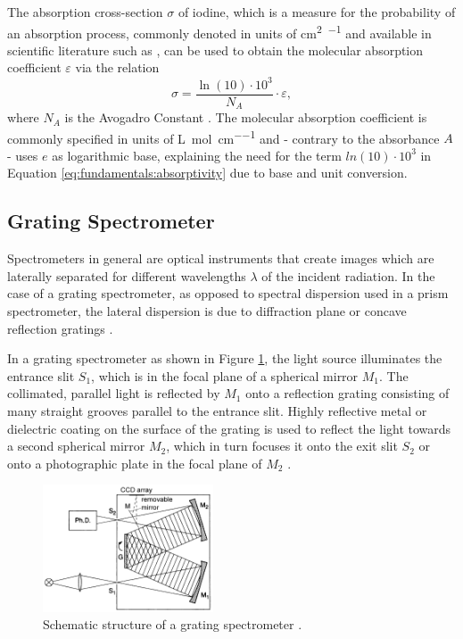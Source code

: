 The absorption cross-section $\sigma$ of iodine, which is a measure for the probability of an absorption process, commonly denoted in units of \si{\cm\squared\per\molecule} and available in scientific literature such as \cite{Iodine}, can be used to obtain the molecular absorption coefficient $\varepsilon$ via the relation
\begin{equation}
    \label{eq:fundamentals:absorptivity}
    \sigma = \frac{\ln(10) \cdot 10^3}{N_A} \cdot \varepsilon ,
\end{equation}
where $N_A$ is the Avogadro Constant \cite{attenuation}. The molecular absorption coefficient is commonly specified in units of \si{\liter\per\mol\per\cm} and - contrary to the absorbance $A$ - uses $e$ as logarithmic base, explaining the need for the term $ln(10) \cdot 10^3$ in Equation \ref{eq:fundamentals:absorptivity} due to base and unit conversion.


\subsection{Grating Spectrometer}

Spectrometers in general are optical instruments that create images which are laterally separated for different wavelengths $\lambda$ of the incident radiation. In the case of a grating spectrometer, as opposed to spectral dispersion used in a prism spectrometer, the lateral dispersion is due to diffraction plane or concave reflection gratings \cite{demtroder2014laser}.

In a grating spectrometer as shown in Figure \ref{fig:fundamentals:spectrometer}, the light source illuminates the entrance slit $S_1$, which is in the focal plane of a spherical mirror $M_1$. The collimated, parallel light is reflected by $M_1$ onto a reflection grating consisting of many straight grooves parallel to the entrance slit. Highly reflective metal or dielectric coating on the surface of the grating is used to reflect the light towards a second spherical mirror $M_2$, which in turn focuses it onto the exit slit $S_2$ or onto a photographic plate in the focal plane of $M_2$ \cite{demtroder2014laser}.

\begin{figure}[H]
    \centering
    \includegraphics[width=0.45\textwidth]{graphics/spectrometer.png}
    \caption{Schematic structure of a grating spectrometer \cite{demtroder2014laser}.}
    \label{fig:fundamentals:spectrometer}
\end{figure}

